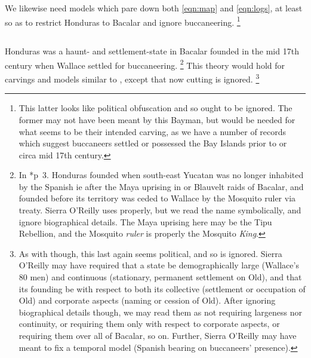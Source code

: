 		We likewise need models which pare down both \ref{eqn:map} and \ref{eqn:logs}, at least so as to restrict Honduras to Bacalar and ignore buccaneering.%
		\footnote{This latter looks like political obfuscation and so ought to be ignored. The former may not have been meant by this Bayman, but would be needed for what seems to be their intended carving, as we have a number of records which suggest buccaneers settled or possessed the Bay Islands prior to or circa mid 17th century.} %
	\subsection{}
	\label{ss:fenix}
		Honduras was a haunt- and settlement-state in Bacalar founded in the mid 17th century when Wallace settled for buccaneering.%
		\footnote{In \cite{fen49}*{p~3}. Honduras founded when south-east Yucatan was no longer inhabited by the Spanish ie after the Maya uprising in or Blauvelt raids of Bacalar, and founded before its territory was ceded to Wallace by the Mosquito ruler via treaty. Sierra O'Reilly uses  properly, but we read the name symbolically, and ignore biographical details. The Maya uprising here may be the Tipu Rebellion, and the Mosquito \emph{ruler} is properly the Mosquito \emph{King}.} %
		This theory would hold for carvings and models similar to , except that now cutting is ignored.%
		\footnote{As with  though, this last again seems political, and so is ignored. Sierra O'Reilly may have required that a state be demographically large (Wallace's 80 men) and continuous (stationary, permanent settlement on Old), and that its founding be with respect to both its collective (settlement or occupation of Old) and corporate aspects (naming or cession of Old). After ignoring biographical details though, we may read them as not requiring largeness nor continuity, or requiring them only with respect to corporate aspects, or requiring them over all of Bacalar, so on. Further, Sierra O'Reilly may have meant to fix a temporal model (Spanish bearing on buccaneers' presence).}
